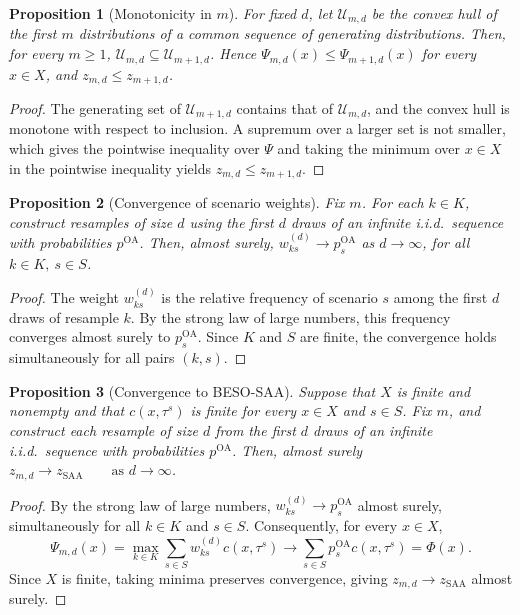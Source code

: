 \documentclass[mnsc,sglanonrev]{informs4}  %
\newtheorem{proposition}{Proposition}
\theoremstyle{remark}\newtheorem{remark}{Remark}
\begin{document}
\begin{APPENDICES}
\begin{proposition}[Monotonicity in $m$]\label{prop:monoton}
For fixed \(d\), let \(\mathcal U_{m,d}\) be the convex hull of the first \(m\) distributions of a common sequence of generating distributions. Then, for every \(m\geq1\), $\mathcal U_{m,d}\subseteq\mathcal U_{m+1,d}$. Hence $\Psi_{m,d}(x)\le\Psi_{m+1,d}(x)$ for every $x\in X$, and $z_{m,d}\le z_{m+1,d}$.
\end{proposition}

\begin{proof}
The generating set of $\mathcal U_{m+1,d}$ contains that of $\mathcal U_{m,d}$, and the convex hull is monotone with respect to inclusion. A supremum over a larger set is not smaller, which gives the pointwise inequality over $\Psi$ and taking the minimum over \(x\in X\) in the pointwise inequality yields \(z_{m,d}\leq z_{m+1,d}\).
\end{proof}

\begin{proposition}[Convergence of scenario weights] \label{prop:weightconv}
Fix $m$. For each $k\in K$, construct resamples of size $d$ using the first $d$ draws of an infinite i.i.d.\ sequence
with probabilities $p^{\mathrm{OA}}$. Then, almost surely,
$w_{ks}^{(d)}\longrightarrow p_s^{\mathrm{OA}}$ as $d\to\infty$, for all $k\in K,\ s\in S$.
\end{proposition}

\begin{proof}
The weight $w_{ks}^{(d)}$ is the relative frequency of scenario $s$ among the first $d$ draws of resample $k$.
By the strong law of large numbers, this frequency converges almost surely to $p_s^{\mathrm{OA}}$.
Since $K$ and $S$ are finite, the convergence holds simultaneously for all pairs $(k,s)$.
\end{proof}

\begin{proposition}[Convergence to BESO-SAA]\label{prop:DROSAA}
Suppose that $X$ is finite and nonempty and that $c(x,\tau^s)$ is finite for every $x\in X$ and $s\in S$.
Fix $m$, and construct each resample of size $d$ from the first $d$ draws of an infinite i.i.d.\ sequence with probabilities $p^{\mathrm{OA}}$. Then, almost surely $z_{m,d}\longrightarrow z_{\mathrm{SAA}} \qquad\text{as }d\to\infty$.
\end{proposition}

\begin{proof}
By the strong law of large numbers, $w_{ks}^{(d)}\to p_s^{\mathrm{OA}}$ almost surely, simultaneously for all $k\in K$ and $s\in S$.
Consequently, for every $x\in X$,
\[
\Psi_{m,d}(x) =\max_{k\in K}\sum_{s\in S}w_{ks}^{(d)}c(x,\tau^s)
\longrightarrow
\sum_{s\in S}p_s^{\mathrm{OA}}c(x,\tau^s) =\Phi(x).
\]
Since $X$ is finite, taking minima preserves convergence, giving $z_{m,d}\to z_{\mathrm{SAA}}$ almost surely.
\end{proof}


\end{APPENDICES}
\end{document}

